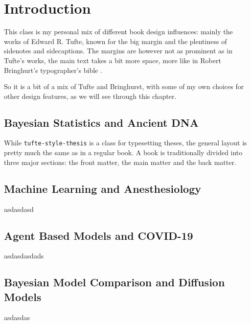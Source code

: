 
\chapter{Introduction}

This class is my personal mix of different book design influences: mainly the works of Edward R. Tufte,
\parencite{heltbergSpatialHeterogeneityAffects2022a, korneliussenANGSDAnalysisNext2014} known for the big margin and the plentiness of
sidenotes and sidecaptions. The margins are however not as prominent as in Tufte's works, the main text takes a bit more space,
more like in Robert Bringhurt's typographer's bible \autocite{heltbergSpatialHeterogeneityAffects2022a}.

So it is a bit of a mix of Tufte and Bringhurst,
with some of my own choices for other design features, as we will see through this chapter.

\section{Bayesian Statistics and Ancient DNA}

While \texttt{tufte-style-thesis} is a class for typesetting theses,
the general layout is pretty much the same as in a regular book.
A book is traditionally divided into three major sections:
the front matter, the main matter and the back matter.


\section{Machine Learning and Anesthesiology}
asdasdasd


\section{Agent Based Models and COVID-19}

asdasdasdads



\section{Bayesian Model Comparison and Diffusion Models}

asdasdas
